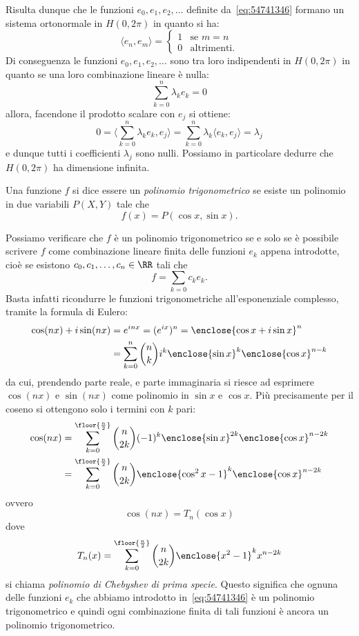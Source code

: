 Risulta dunque che le funzioni $e_0,e_1,e_2,\dots$ definite da~\eqref{eq:54741346}
formano un sistema ortonormale in $H(0,2\pi)$
in quanto si ha:
\[
  \langle e_n, e_m \rangle =
  \begin{cases} 1 &\text{se $m=n$}\\
  0 & \text{altrimenti}.
  \end{cases}
\]
Di conseguenza le funzioni $e_0,e_1,e_2, \dots$ sono tra loro indipendenti
in $H(0,2\pi)$ in quanto se una loro combinazione lineare è nulla:
\[
  \sum_{k=0}^n \lambda_k e_k = 0
\]
allora, facendone il prodotto scalare con $e_j$ si ottiene:
\[
  0 = \langle \sum_{k=0}^n \lambda_k e_k , e_j\rangle
  = \sum_{k=0}^n \lambda_k \langle e_k, e_j\rangle
  = \lambda_j
\]
e dunque tutti i coefficienti $\lambda_j$ sono nulli.
Possiamo in particolare dedurre che $H(0,2\pi)$ ha dimensione
infinita.

\begin{definition}
Una funzione $f$ si dice essere un \emph{polinomio trigonometrico}%
se esiste un polinomio in due variabili $P(X,Y)$ tale che
\[
  f(x) = P(\cos x, \sin x).
\]
\end{definition}

Possiamo verificare che $f$ è un polinomio trigonometrico se e solo se
è possibile scrivere $f$ come combinazione lineare finita delle funzioni $e_k$
appena introdotte,
cioè se esistono $c_0, c_1, \dots, c_n\in \RR$ tali che
\[
  f = \sum_{k=0} c_k e_k.
\]
Basta infatti ricondurre le funzioni trigonometriche all'esponenziale complesso,
tramite la formula di Eulero:
\begin{align*}
   \cos(nx) + i \sin(nx)
   &= e^{inx} = (e^{ix})^n
   = \enclose{\cos x + i \sin x}^n\\
   &= \sum_{k=0}^n {n \choose k} i^k \enclose{\sin x}^k \enclose{\cos x}^{n-k}
\end{align*}
da cui, prendendo parte reale, e parte immaginaria si
riesce ad esprimere $\cos(nx)$ e $\sin(nx)$ come polinomio in $\sin x$ e $\cos x$.
Più precisamente per il coseno
si ottengono solo i termini con $k$ pari:
\begin{align*}
\cos(nx) &= \sum_{k=0}^{\floor{\frac n 2}} {n \choose 2k} (-1)^k \enclose{\sin x}^{2k} \enclose{\cos x}^{n-2k}\\
&= \sum_{k=0}^{\floor{\frac n 2}}{n \choose 2k} \enclose{\cos^2 x -1}^k \enclose{\cos x}^{n-2k}
\end{align*}
ovvero
\[
  \cos(nx) = T_n(\cos x)
\]
dove
\[
  T_n(x) = \sum_{k=0}^{\floor{\frac n 2}}{n \choose 2k} \enclose{x^2 -1}^k x^{n-2k}
\]
si chiama \emph{polinomio di Chebyshev di prima specie}.
%
%
Questo significa che ognuna delle funzioni $e_k$ che abbiamo introdotto
in~\eqref{eq:54741346} è un polinomio trigonometrico e quindi ogni
combinazione finita di tali funzioni è ancora un polinomio trigonometrico.

